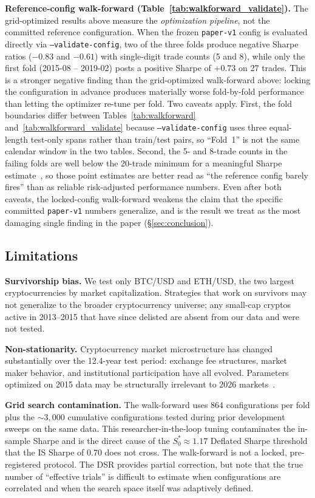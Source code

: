 \documentclass{article}
\begin{document}
\textbf{Reference-config walk-forward (Table~\ref{tab:walkforward_validate}).}
The grid-optimized results above measure the \emph{optimization pipeline}, not the committed reference configuration.
When the frozen \texttt{paper-v1} config is evaluated directly via \texttt{--validate-config}, two of the three folds produce negative Sharpe ratios ($-0.83$ and $-0.61$) with single-digit trade counts (5 and 8), while only the first fold (2015-08 -- 2019-02) posts a positive Sharpe of $+0.73$ on 27 trades.
This is a stronger negative finding than the grid-optimized walk-forward above: locking the configuration in advance produces materially worse fold-by-fold performance than letting the optimizer re-tune per fold.
Two caveats apply.
First, the fold boundaries differ between Tables~\ref{tab:walkforward} and~\ref{tab:walkforward_validate} because \texttt{--validate-config} uses three equal-length test-only spans rather than train/test pairs, so ``Fold~1'' is not the same calendar window in the two tables.
Second, the 5- and 8-trade counts in the failing folds are well below the 20-trade minimum for a meaningful Sharpe estimate~\citep{lo2002statistics}, so those point estimates are better read as ``the reference config barely fires'' than as reliable risk-adjusted performance numbers.
Even after both caveats, the locked-config walk-forward weakens the claim that the specific committed \texttt{paper-v1} numbers generalize, and is the result we treat as the most damaging single finding in the paper (\S\ref{sec:conclusion}).

\subsection{Limitations}

\textbf{Survivorship bias.} We test only BTC/USD and ETH/USD, the two largest cryptocurrencies by market capitalization.
Strategies that work on survivors may not generalize to the broader cryptocurrency universe; any small-cap cryptos active in 2013--2015 that have since delisted are absent from our data and were not tested.

\textbf{Non-stationarity.} Cryptocurrency market microstructure has changed substantially over the 12.4-year test period: exchange fee structures, market maker behavior, and institutional participation have all evolved.
Parameters optimized on 2015 data may be structurally irrelevant to 2026 markets~\citep{Ang2012Regimes}.

\textbf{Grid search contamination.} The walk-forward uses 864 configurations per fold plus the ${\sim}3{,}000$ cumulative configurations tested during prior development sweeps on the same data.
This researcher-in-the-loop tuning contaminates the in-sample Sharpe and is the direct cause of the $S_0^* \approx 1.17$ Deflated Sharpe threshold that the IS Sharpe of 0.70 does not cross.
The walk-forward is not a locked, pre-registered protocol.
The DSR provides partial correction, but \citet{Bailey2017PBO} note that the true number of ``effective trials'' is difficult to estimate when configurations are correlated and when the search space itself was adaptively defined.
\end{document}
